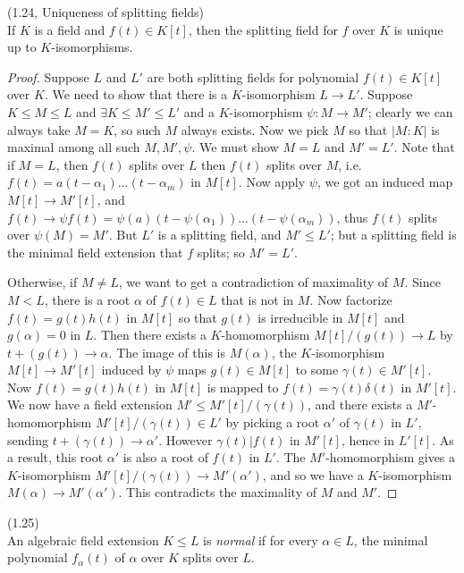 \documentclass[a4paper]{article}
\begin{document}
\begin{thm} (1.24, Uniqueness of splitting fields)\\
If $K$ is a field and $f(t) \in K[t]$, then the splitting field for $f$ over $K$ is unique up to $K$-isomorphisms.
\begin{proof}
Suppose $L$ and $L'$ are both splitting fields for polynomial $f(t) \in K[t]$ over $K$. We need to show that there is a $K$-isomorphism $L \to L'$. Suppose $K \leq M \leq L$ and $\exists K \leq M' \leq L'$ and a $K$-isomorphism $\psi: M \to M'$; clearly we can always take $M=K$, so such $M$ always exists. Now we pick $M$ so that $|M:K|$ is maximal among all such $M,M',\psi$. We must show $M=L$ and $M'=L'$. Note that if $M=L$, then $f(t)$ splits over $L$ then $f(t)$ splits over $M$, i.e. $f(t) = a(t-\alpha_1)...(t-\alpha_m)$ in $M[t]$. Now apply $\psi$, we got an induced map $M[t] \to M'[t]$, and $f(t) \to \psi f(t) = \psi(a)(t-\psi(\alpha_1))...(t-\psi(\alpha_m))$, thus $f(t)$ splits over $\psi(M) = M'$. But $L'$ is a splitting field, and $M' \leq L'$; but a splitting field is the minimal field extension that $f$ splits; so $M'=L'$.

Otherwise, if $M \neq L$, we want to get a contradiction of maximality of $M$. Since $M < L$, there is a root $\alpha$ of $f(t) \in L$ that is not in $M$. Now factorize $f(t) = g(t) h(t)$ in $M[t]$ so that $g(t)$ is irreducible in $M[t]$ and $g(\alpha)=0$ in $L$. Then there exists a $K$-homomorphism $M[t]/(g(t)) \to L$ by $t+(g(t)) \to \alpha$. The image of this is $M(\alpha)$, the $K$-isomorphism $M[t] \to M'[t]$ induced by $\psi$ maps $g(t)\in M[t]$ to some $\gamma(t) \in M'[t]$. Now $f(t) = g(t)h(t)$ in $M[t]$ is mapped to $f(t) = \gamma(t) \delta(t)$ in $M'[t]$. We now have a field extension $M' \leq M'[t] / (\gamma(t))$, and there exists a $M'$-homomorphism $M'[t]/(\gamma(t)) \in L'$ by picking a root $\alpha'$ of $\gamma(t)$ in $L'$, sending $t+(\gamma(t)) \to \alpha'$. However $\gamma(t) |f(t)$ in $M'[t]$, hence in $L'[t]$. As a result, this root $\alpha'$ is also a root of $f(t)$ in $L'$. The $M'$-homomorphism gives a $K$-isomorphism $M'[t] / (\gamma(t)) \to M'(\alpha')$, and so we have a $K$-isomorphism $M(\alpha) \to M'(\alpha')$. This contradicts the maximality of $M$ and $M'$.
\end{proof}
\end{thm}

\begin{defi} (1.25)\\
An algebraic field extension $K \leq L$ is \emph{normal} if for every $\alpha \in L$, the minimal polynomial $f_\alpha(t)$ of $\alpha$ over $K$ splits over $L$.
\end{defi}
\end{document}
